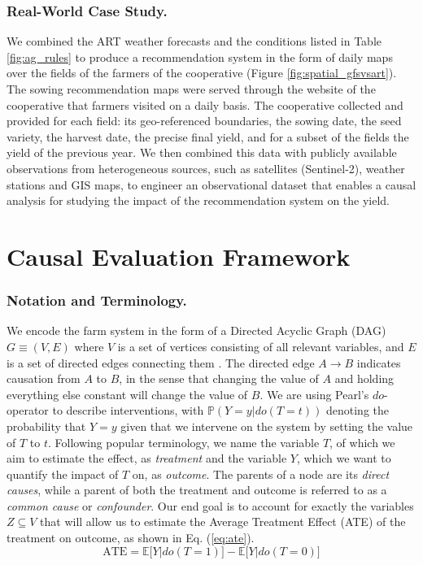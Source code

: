 \documentclass[letterpaper]{article} %
\begin{document}
\subsubsection{Real-World Case Study.}


We combined the ART weather forecasts and the conditions listed in Table \ref{fig:ag_rules} to produce a recommendation system in the form of daily maps over the fields of the farmers of the cooperative (Figure \ref{fig:spatial_gfsvsart}). The sowing recommendation maps were served through the website of the cooperative that farmers visited on a daily basis.
The cooperative collected and provided for each field: its geo-referenced boundaries, the sowing date, the seed variety, the harvest date, the precise final yield, and for a subset of the fields the yield of the previous year. We then combined this data with publicly available observations from heterogeneous sources, such as satellites (Sentinel-2), weather stations and GIS maps, to engineer an observational dataset that enables a causal analysis for studying the impact of the recommendation system on the yield.

\section{Causal Evaluation Framework}

\subsubsection{Notation and Terminology.}

We encode the farm system in the form of a Directed Acyclic Graph (DAG) $G \equiv (V,E)$ where $V$ is a set of vertices consisting of all relevant variables, and $E$ is a set of directed edges connecting them \cite{pearl2009causality}. The directed edge $A \rightarrow B$ indicates causation from $A$ to $B$, in the sense that changing the value of $A$ and holding everything else constant will change the value of $B$. We are using Pearl's $do$-operator to describe interventions, with $\mathbb{P}(Y=y|do(T=t))$ denoting the probability that $Y = y$ given that we intervene on the system by setting the value of $T$ to $t$. Following popular terminology, we name the variable $T$, of which we aim to estimate the effect, as \textit{treatment} and the variable $Y$, which we want to quantify the impact of $T$ on, as \textit{outcome}. The parents of a node are its \textit{direct causes}, while a parent of both the treatment and outcome is referred to as a \textit{common cause} or \textit{confounder}. Our end goal is to account for exactly the variables $Z \subseteq V$ that will allow us to estimate the Average Treatment Effect (ATE) of the treatment on outcome, as shown in Eq. (\ref{eq:ate}).
\begin{equation}\label{eq:ate}
    \text{ATE} = \mathbb{E}\big[Y|do(T=1)\big] - \mathbb{E}\big[Y|do(T=0)\big]
\end{equation}
\end{document}
